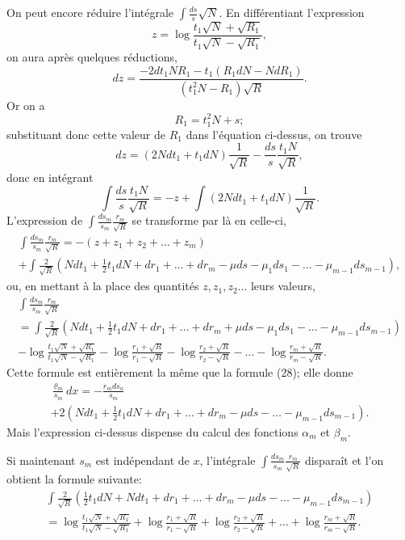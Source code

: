 \documentclass[oneside, 12 pt, leqno]{memoir}
\begin{document}
On peut encore réduire l'intégrale \(\int \frac{ds}{s} \sqrt{N}\). En différentiant l'expression
\[z=\log \frac{t_1 \sqrt{N}+\sqrt{R_1}}{t_1 \sqrt{N}-\sqrt{R_1}},\]
on aura après quelques réductions,
\[d z=\frac{-2 d t_1 N R_1-t_1\left(R_1 d N-N d R_1\right)}{\left(t_1^2 N-R_1\right) \sqrt{R}}.\]
Or on a
\[R_1=t_1^2 N+s;\]
substituant donc cette valeur de \(R_1\) dans l'équation ci-dessus, on trouve
\[d z=\left(2 N d t_1+t_1 d N\right) \frac{1}{\sqrt{R}}-\frac{d s}{s} \frac{t_1 N}{\sqrt{R}},\]
donc en intégrant
\[\int \frac{d s}{s} \frac{t_1 N}{\sqrt{R}}=-z+\int\left(2 N d t_1+t_1 d N\right) \frac{1}{\sqrt{R}}.\]
L'expression de \(\int \frac{d s_m}{s_m} \frac{r_m}{\sqrt{R}}\) se transforme par là en celle-ci,
\[\begin{gathered}
\int \frac{d s_{m}}{s_m} \frac{r_m}{\sqrt{R}}=-\left(z+z_1+z_2+\dots+z_m\right) \\
+\int \frac{2}{\sqrt{R}}\left(N d t_1+\frac{1}{2} t_1 d N+d r_1+\dots+d r_m-\mu d s-\mu_1 d s_1-\dots-\mu_{m-1} d s_{m-1}\right),
\end{gathered}\]
ou, en mettant à la place des quantités \(z, z_1, z_2 \dots\) leurs valeurs,
\[\tag{36}
\begin{gathered}
 \int\frac{ds_m}{s_m} \frac{r_m}{\sqrt{R}} \\
 =\int \frac{2}{\sqrt{R}}\left(N d t_1+\frac{1}{2} t_1 d N+d r_1+\dots+d r_m+\mu d s-\mu_1 d s_1-\dots-\mu_{m-1} d s_{m-1}\right) \\
 -\log \frac{t_1 \sqrt{N}+\sqrt{R_1}}{t_1 \sqrt{N}-\sqrt{R_1}}-\log \frac{r_1+\sqrt{R}}{r_1-\sqrt{R}}- \log \frac{r_2+\sqrt{R}}{r_2-\sqrt{R}}-\dots-\log \frac{r_m+\sqrt{R}}{r_m-\sqrt{R}}.
\end{gathered}\]
Cette formule est entièrement la même que la formule (28); elle donne
\[\tag{37}\begin{gathered}
\frac{\varrho_m}{s_m} d x=-\frac{r_m d s_n}{s_m} \\
+2\left(N d t_1+\frac{1}{2} t_1 d N+d r_1+\dots+d r_m-\mu d s-\dots-\mu_{m-1} d s_{m-1}\right).
\end{gathered}\]
Mais l'expression ci-dessus dispense du calcul des fonctions \(\alpha_m\) et \(\beta_m\).

Si maintenant \(s_m\) est indépendant de \(x\), l'intégrale \(\int \frac{d s_m}{s_m} \frac{r_m}{\sqrt{R}}\) disparaît et l'on obtient la formule suivante:
\[\tag{38} \begin{gathered}
 \int \frac{2}{\sqrt{R}}\left(\frac{1}{2} t_1 d N+N d t_1+d r_1+\dots+d r_m-\mu d s-\dots-\mu_{m-1} d s_{m-1}\right) \\
=  \log \frac{t_1 \sqrt{N}+\sqrt{R_1}}{t_1 \sqrt{N}-\sqrt{R_1}}+\log \frac{r_1+\sqrt{R}}{r_1-\sqrt{R}}+\log \frac{r_2+\sqrt{R}}{r_2-\sqrt{R}}+\dots+\log \frac{r_m+\sqrt{R}}{r_m-\sqrt{R}}.
\end{gathered}\]
\end{document}
